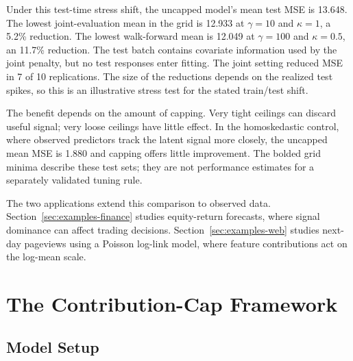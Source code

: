 \documentclass[article,shortnames,nofooter]{jss}
\begin{document}
\begin{table}[ht]
    \centering
    \small
    
    \caption{Mean test MSE for per-observation walk-forward evaluation under the same data draws and ceiling calibration as Table~\ref{tab:simulate_full}. Bold marks the lowest mean among capped specifications in this table.}
    \label{tab:simulate_walk}
\end{table}

Under this test-time stress shift, the uncapped model's mean test MSE is 13.648. The lowest joint-evaluation mean in the grid is 12.933 at $\gamma=10$ and $\kappa=1$, a 5.2\% reduction. The lowest walk-forward mean is 12.049 at $\gamma=100$ and $\kappa=0.5$, an 11.7\% reduction. The test batch contains covariate information used by the joint penalty, but no test responses enter fitting. The joint setting reduced MSE in 7 of 10 replications. The size of the reductions depends on the realized test spikes, so this is an illustrative stress test for the stated train/test shift.

The benefit depends on the amount of capping. Very tight ceilings can discard useful signal; very loose ceilings have little effect. In the homoskedastic control, where observed predictors track the latent signal more closely, the uncapped mean MSE is 1.880 and capping offers little improvement. The bolded grid minima describe these test sets; they are not performance estimates for a separately validated tuning rule.

The two applications extend this comparison to observed data. Section~\ref{sec:examples-finance} studies equity-return forecasts, where signal dominance can affect trading decisions. Section~\ref{sec:examples-web} studies next-day pageviews using a Poisson log-link model, where feature contributions act on the log-mean scale.

\section{The Contribution-Cap Framework}\label{sec:framework}

\subsection{Model Setup}
\end{document}
